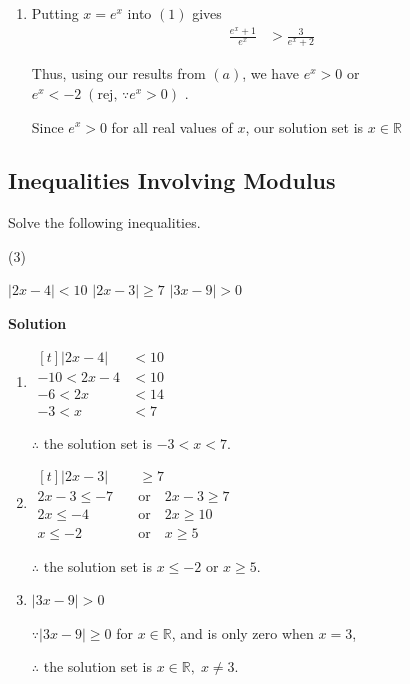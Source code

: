\documentclass[11pt,a4paper]{book}
\newcommand{\R}{\mathbb{R}}
\begin{document}
\begin{example}{}
\begin{enumerate}[label=(\alph*)]
\item Putting $x=e^{x}$ into $\left(1\right)$ gives
\begin{align*}
{\displaystyle \frac{e^{x}+1}{e^{x}}} & >\frac{3}{e^{x}+2}
\end{align*}

Thus, using our results from $\left(a\right)$, we have $e^{x}>0$
or $e^{x}<-2\;(\text{rej, }\because e^{x}>0)$ .

Since $e^{x}>0$ for all real values of $x$, our solution set is
$x\in\R$

\end{enumerate}
\end{example}{}

\newpage

\subsection{Inequalities Involving Modulus}

\begin{example}{}

Solve the following inequalities.

\begin{tasks}[label=(\alph*),label-width=3.5ex](3)

\task $\left|2x-4\right|<10$
\task $\left|2x-3\right|\geq7$
\task $\left|3x-9\right|>0$

\end{tasks}

\textbf{Solution}

\begin{enumerate}[label=(\alph*)]

\item
$
\begin{aligned}[t]
\left|2x-4\right| & <10\\
-10<2x-4 & <10\\
-6<2x & <14\\
-3<x & <7
\end{aligned}
$

$\therefore$ the solution set is $-3<x<7$.

\item
$
\begin{aligned}[t]
\left|2x-3\right| & \geq7\\
2x-3\leq-7\quad & \text{or}\quad2x-3\geq7\\
2x\leq-4\quad & \text{or}\quad2x\geq10\\
x\leq-2\quad & \text{or}\quad x\geq5
\end{aligned}
$

$\therefore$ the solution set is $x\leq-2$ or $x\geq5$.

\item $\left|3x-9\right|>0$

$\because\left|3x-9\right|\geq0$ for $x\in\R$, and is only zero
when $x=3$,

$\therefore$ the solution set is $x\in\R,\;x\neq3$.

\end{enumerate}
\end{example}
\end{document}
